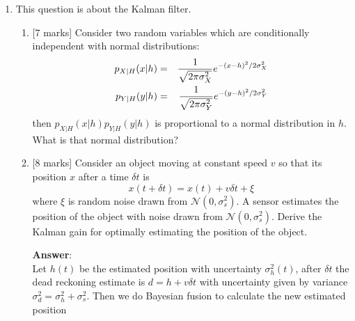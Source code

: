 \documentclass{article}
\newif\ifanswer
\begin{document}
\begin{enumerate}

\item This question is about the Kalman filter. 
\begin{enumerate}
\item{}[7 marks] Consider two random variables which are conditionally independent with normal distributions:
  \begin{eqnarray}
    p_{X|H}(x|h)&=&\frac{1}{\sqrt{2\pi\sigma_X^2}}e^{-(x-h)^2/2\sigma_X^2}\cr
    p_{Y|H}(y|h)&=&\frac{1}{\sqrt{2\pi\sigma_Y^2}}e^{-(y-h)^2/2\sigma_Y^2}
  \end{eqnarray}
  then $p_{X|H}(x|h)p_{Y|H}(y|h)$ is proportional to a normal distribution in $h$. What is that normal distribution?
 
  \ifanswer \textbf{Answer}:\\  Well this is just an exercise in matching terms, with the obvious notation:
  \begin{equation}
    \frac{1}{\sigma^2}(h^2-2h\mu)=\frac{1}{\sigma_X^2}(h^2-2hx)+\frac{1}{\sigma_Y^2}(h^2-2hy)
  \end{equation}
  so
  \begin{equation}
    \frac{1}{\sigma^2}=\frac{1}{\sigma_X^2}+\frac{1}{\sigma_Y^2}
  \end{equation}
  and
  \begin{equation}
  \mu=\frac{\sigma^2}{\sigma_X^2}x+\frac{\sigma^2}{\sigma_Y^2}y
  \end{equation}
  \fi
\item{}[8 marks] Consider an object moving at constant speed $v$ so that its position $x$ after a time $\delta t$ is
  $$
  x(t+\delta t)=x(t)+v\delta t+\xi
  $$ where $\xi$ is random noise drawn from
  $\mathcal{N}(0,\sigma^2_s)$. A sensor estimates the position of the
  object with noise drawn from $\mathcal{N}(0,\sigma^2_s)$. Derive the
  Kalman gain for optimally estimating the position of the object.

  \ifanswer \textbf{Answer}:\\ Let $h(t)$ be the estimated position with uncertainty
  $\sigma_h^2(t)$, after $\delta t$ the dead reckoning estimate is
  $d=h+v\delta t$ with uncertainty given by variance
  $\sigma_d^2=\sigma_h^2+\sigma_s^2$. Then we do Bayesian fusion to calculate the new estimated position
 

\end{enumerate}
\end{enumerate}
\end{document}
